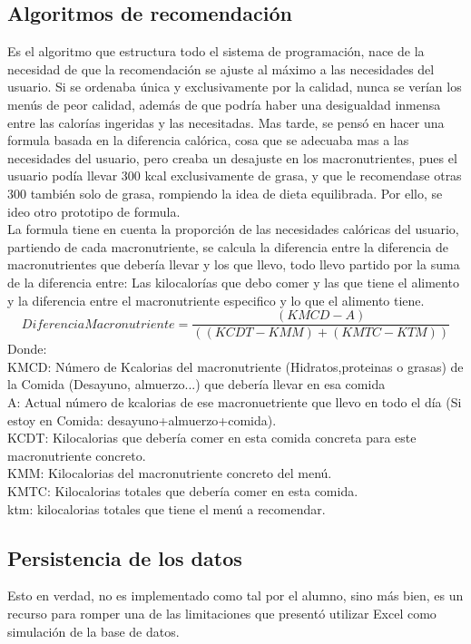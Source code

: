 \subsection{Algoritmos de recomendación}
Es el algoritmo que estructura todo el sistema de programación, nace de la necesidad de que la recomendación se ajuste al máximo a las necesidades del usuario. Si se ordenaba única y exclusivamente por la calidad, nunca se verían los menús de peor calidad, además de que podría haber una desigualdad inmensa entre las calorías ingeridas y las necesitadas. Mas tarde, se pensó en hacer una formula basada en la diferencia calórica, cosa que se adecuaba mas a las necesidades del usuario, pero creaba un desajuste en los macronutrientes, pues el usuario podía llevar 300 kcal exclusivamente de grasa, y que le recomendase otras 300 también solo de grasa, rompiendo la idea de dieta equilibrada. Por ello, se ideo otro prototipo de formula.\\

La formula tiene en cuenta la proporción de las necesidades calóricas del usuario, partiendo de cada macronutriente, se calcula la diferencia entre la diferencia de macronutrientes que debería llevar y los que llevo, todo llevo partido por la suma de la diferencia entre: Las kilocalorías que debo comer y las que tiene el alimento y la diferencia entre el macronutriente especifico y lo que el alimento tiene.\\
\begin{equation}
DiferenciaMacronutriente = \frac{(KMCD - A)}{((KCDT-KMM)+(KMTC-KTM))}
\end{equation}
Donde:\\

KMCD: Número de Kcalorias del macronutriente (Hidratos,proteinas o grasas) de la Comida (Desayuno, almuerzo...) que debería llevar en esa comida\\
A: Actual número de kcalorias de ese macronuetriente que llevo en todo el día (Si estoy en Comida: desayuno+almuerzo+comida).\\
KCDT: Kilocalorias que debería comer en esta comida concreta para este macronutriente concreto.\\
KMM: Kilocalorias del macronutriente concreto del menú.\\
KMTC: Kilocalorias totales que debería comer en esta comida.\\
ktm: kilocalorias totales que tiene el menú a recomendar.\\
\subsection{Persistencia de los datos}
Esto en verdad, no es implementado como tal por el alumno, sino más bien, es un recurso para romper una de las limitaciones que presentó utilizar Excel como simulación de la base de datos.\\


